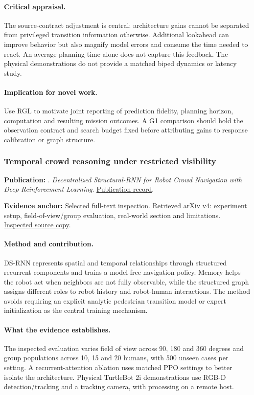 \paragraph{Critical appraisal.} The source-contract adjustment is central: architecture gains cannot be separated from privileged transition information otherwise. Additional lookahead can improve behavior but also magnify model errors and consume the time needed to react. An average planning time alone does not capture this feedback. The physical demonstrations do not provide a matched biped dynamics or latency study.

\paragraph{Implication for novel work.} Use RGL to motivate joint reporting of prediction fidelity, planning horizon, computation and resulting mission outcomes. A G1 comparison should hold the observation contract and search budget fixed before attributing gains to response calibration or graph structure.

\subsubsection{Temporal crowd reasoning under restricted visibility}\label{paper:dsrnn}
\textbf{Publication:} \citet{dsrnn}. \emph{Decentralized Structural-RNN for Robot Crowd Navigation with Deep Reinforcement Learning}. \href{https://doi.org/10.1109/icra48506.2021.9561595}{Publication record}.

\textbf{Evidence anchor:} Selected full-text inspection. Retrieved arXiv v4: experiment setup, field-of-view/group evaluation, real-world section and limitations. \href{https://arxiv.org/pdf/2011.04820}{Inspected source copy}.

\paragraph{Method and contribution.} DS-RNN represents spatial and temporal relationships through structured recurrent components and trains a model-free navigation policy. Memory helps the robot act when neighbors are not fully observable, while the structured graph assigns different roles to robot history and robot-human interactions. The method avoids requiring an explicit analytic pedestrian transition model or expert initialization as the central training mechanism.

\paragraph{What the evidence establishes.} The inspected evaluation varies field of view across 90, 180 and 360 degrees and group populations across 10, 15 and 20 humans, with 500 unseen cases per setting. A recurrent-attention ablation uses matched PPO settings to better isolate the architecture. Physical TurtleBot 2i demonstrations use RGB-D detection/tracking and a tracking camera, with processing on a remote host.

